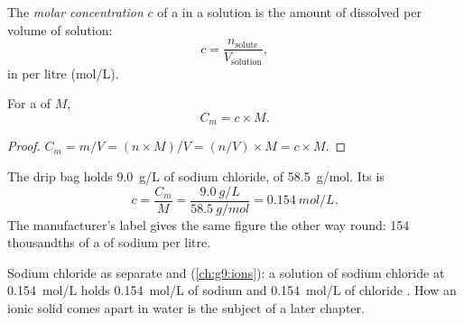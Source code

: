 \begin{definition}\label{def:g10:concentration-and-dilution:molar-concentration}
The \emph{molar concentration} $c$ of a
 in a solution is the amount of dissolved  per volume of
solution:
\[
  c = \frac{n_{\text{solute}}}{V_{\text{solution}}},
\]
in  per litre (\si{mol/L}).
\end{definition}

\begin{proposition}\label{prop:g10:concentration-and-dilution:link}
For a  of  $M$,
\[
  C_m = c \times M .
\]
\end{proposition}

\begin{proof}
$C_m = m / V = (n \times M) / V = (n / V) \times M = c \times M$.
\end{proof}

\begin{example}\label{ex:g10:concentration-and-dilution:drip}
The drip bag holds \qty{9.0}{g/L} of sodium chloride, of 
\qty{58.5}{g/mol}. Its  is
\[
  c = \frac{C_m}{M} = \frac{\qty{9.0}{g/L}}{\qty{58.5}{g/mol}}
    = \qty{0.154}{mol/L}.
\]
The manufacturer's label gives the same figure the other way round: 154
thousandths of a  of sodium  per litre.
\end{example}

\begin{remark}\label{rem:g10:concentration-and-dilution:ions}
Sodium chloride  as separate   and 
(\cref{ch:g9:ions}): a solution of sodium chloride at \qty{0.154}{mol/L}
holds \qty{0.154}{mol/L} of sodium  and \qty{0.154}{mol/L} of
chloride . How an ionic solid comes apart in water is the subject of
a later chapter.
\end{remark}

